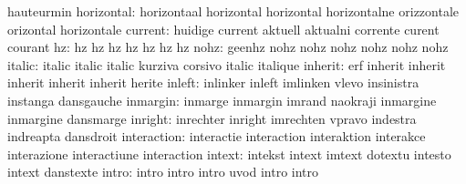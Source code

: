                            hauteurmin
               horizontal: horizontaal               horizontal
                           horizontal                horizontalne
                           orizzontale               orizontal
                           horizontale
                  current: huidige                   current
                           aktuell                   aktualni
                           corrente                  curent
                           courant
                       hz: hz                        hz
                           hz                        hz
                           hz                        hz
                           hz
                     nohz: geenhz                    nohz
                           nohz                      nohz
                           nohz                      nohz
                           nohz
                   italic: italic                    italic
                           italic                    kurziva
                           corsivo                   italic
                           italique
                  inherit: erf                       inherit
                           inherit                   inherit
                           inherit                   inherit
                           herite
                   inleft: inlinker                  inleft
                           imlinken                  vlevo
                           insinistra                instanga
                           dansgauche
                 inmargin: inmarge                   inmargin
                           imrand                    naokraji
                           inmargine                 inmargine
                           dansmarge
                  inright: inrechter                 inright
                           imrechten                 vpravo
                           indestra                  indreapta
                           dansdroit
              interaction: interactie                interaction
                           interaktion               interakce
                           interazione               interactiune
                           interaction
                   intext: intekst                   intext
                           imtext                    dotextu
                           intesto                   intext
                           danstexte
                    intro: intro                     intro
                           intro                     uvod
                           intro                     intro
